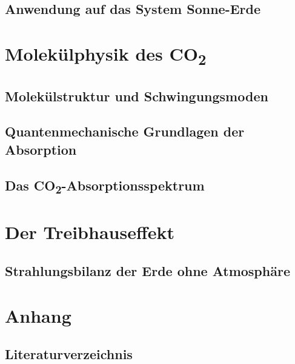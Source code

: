 \documentclass[12pt,a4paper]{article}
\begin{document}
\subsection{Anwendung auf das System Sonne-Erde}

\section{Molekülphysik des CO\textsubscript{2}}

\subsection{Molekülstruktur und Schwingungsmoden}

\subsection{Quantenmechanische Grundlagen der Absorption}

\subsection{Das CO\textsubscript{2}-Absorptionsspektrum}

\section{Der Treibhauseffekt}

\subsection{Strahlungsbilanz der Erde ohne Atmosphäre}

\newpage
\section{Anhang}

\subsection{Literaturverzeichnis}
\printbibliography[heading=none]

\end{document}
